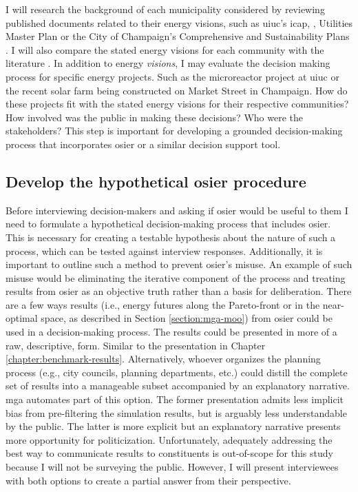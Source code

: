 I will research the background of each municipality considered by reviewing
published documents related to their energy visions, such as \ac{uiuc}'s
\ac{icap},
\cite{institute_for_sustainability_energy_and_environment_illinois_2020},
Utilities Master Plan \cite{affiliated_engineers_inc_utilities_2015} or the City
of Champaign's Comprehensive and Sustainability Plans
\cite{knight_champaign_2013,knight_champaign_2021}. I will also compare the
stated energy visions for each community with the literature
\cite{elmallah_frontlining_2022}. In addition to energy \textit{visions}, I may
evaluate the decision making process for specific energy projects. Such as the
microreactor project at \ac{uiuc} or the recent solar farm being constructed on
Market Street in Champaign. How do these projects fit with the stated energy
visions for their respective communities? How involved was the public in
making these decisions? Who were the stakeholders? This step is important for
developing a grounded decision-making process that incorporates \ac{osier} or a
similar decision support tool. 

\subsection{Develop the hypothetical \ac{osier} procedure}

Before interviewing decision-makers and asking if \ac{osier} would be useful to
them I need to formulate a hypothetical decision-making process that includes
\ac{osier}. This is necessary for creating a testable hypothesis about the nature
of such a process, which can be tested against interview responses. Additionally,
it is important to outline such a method to prevent \ac{osier}'s misuse. An example
of such misuse would be eliminating the iterative component of the process and 
treating results from \ac{osier} as an objective truth rather than a basis for
deliberation.
There are a few ways results (i.e., energy futures along
the Pareto-front or in the near-optimal space, as described in Section
\ref{section:mga-moo}) from \ac{osier} could be used in a decision-making
process. The results could be presented in more of a raw, descriptive, form.
Similar to the presentation in Chapter \ref{chapter:benchmark-results}.
Alternatively, whoever organizes the planning process (e.g., city councils,
planning departments, etc.) could distill the complete set of results into a
manageable subset accompanied by an explanatory narrative. \ac{mga} automates
part of this option. The former presentation admits less implicit bias from
pre-filtering the simulation results, but is arguably less understandable by the
public. The latter is more explicit but an explanatory narrative presents more
opportunity for politicization. Unfortunately, adequately addressing the best
way to communicate results to constituents is out-of-scope for this study
because I will not be surveying the public.
However, I will present interviewees with both options to create a partial
answer from their perspective.

